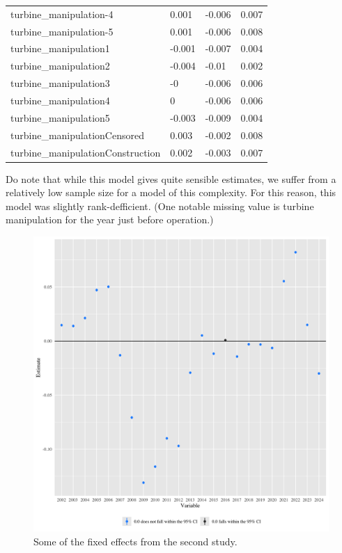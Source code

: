 \documentclass{article}
\begin{document}
\begin{table}[]
\begin{tabular}{llll}
turbine\_manipulation-4           & 0.001             & -0.006         & 0.007           \\
turbine\_manipulation-5           & 0.001             & -0.006         & 0.008           \\
turbine\_manipulation1            & -0.001            & -0.007         & 0.004           \\
turbine\_manipulation2            & -0.004            & -0.01          & 0.002           \\
turbine\_manipulation3            & -0                & -0.006         & 0.006           \\
turbine\_manipulation4            & 0                 & -0.006         & 0.006           \\
turbine\_manipulation5            & -0.003            & -0.009         & 0.004           \\
turbine\_manipulationCensored     & 0.003             & -0.002         & 0.008           \\
turbine\_manipulationConstruction & 0.002             & -0.003         & 0.007          
\end{tabular}
\end{table}

Do note that while this model gives quite sensible estimates, we suffer from a relatively low sample size for a model of this complexity.
For this reason, this model was slightly rank-defficient.
(One notable missing value is turbine manipulation for the year just before operation.)

\begin{figure}[h]
\centering
\includegraphics[width=0.9\linewidth]
{fixef_general.png} 
\caption{Some of the fixed effects from the second study.}
\label{fixef_general}
\end{figure}
\end{document}
